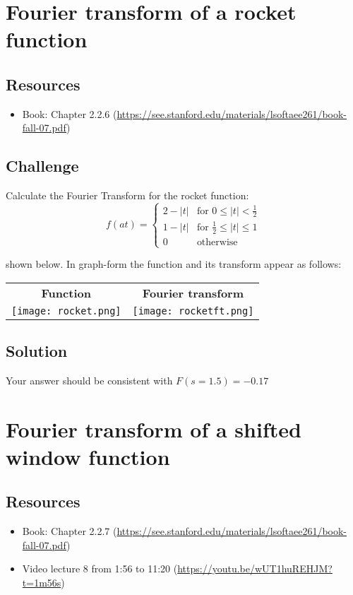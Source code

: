 \section{Fourier transform of a rocket function}

\subsection*{Resources}
\begin{itemize}
    \item Book: Chapter 2.2.6 (\url{https://see.stanford.edu/materials/lsoftaee261/book-fall-07.pdf})
\end{itemize}

\subsection*{Challenge}
Calculate the Fourier Transform for the rocket function:
\begin{equation}
    f(at)=
    \begin{cases}
        2 - |t| & \text{for } 0 \le |t| < \frac{1}{2}\\
        1 - |t| & \text{for } \frac{1}{2} \le |t| \le 1\\
        0 & \text{otherwise}
    \end{cases}
\end{equation}
    
shown below. In graph-form the function and its transform appear as follows:

\begin{tabular}{cc}
    \textbf{Function} & \textbf{Fourier transform} \\
    \texttt{[image: rocket.png]} & \texttt{[image: rocketft.png]}
\end{tabular}

\subsection*{Solution}
Your answer should be consistent with $F(s=1.5) = -0.17$




\iffalse
\newpage
\section{Fourier transform of a shifted window function}

\subsection*{Resources}
\begin{itemize}
    \item Book: Chapter 2.2.7 (\url{https://see.stanford.edu/materials/lsoftaee261/book-fall-07.pdf})
    \item Video lecture 8 from 1:56 to 11:20 (\url{https://youtu.be/wUT1huREHJM?t=1m56s})
\end{itemize}

